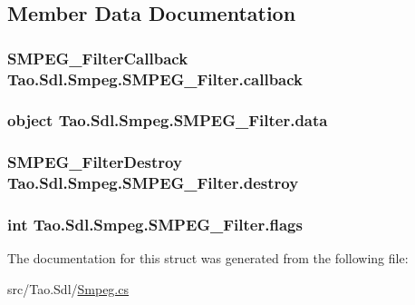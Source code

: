 \subsection{Member Data Documentation}
\hypertarget{struct_tao_1_1_sdl_1_1_smpeg_1_1_s_m_p_e_g___filter_a5b5d470674ea23833cca1917d63dc220}{
\subsubsection[{callback}]{\setlength{\rightskip}{0pt plus 5cm}SMPEG\_\-FilterCallback {\bf Tao.Sdl.Smpeg.SMPEG\_\-Filter.callback}}}
\label{struct_tao_1_1_sdl_1_1_smpeg_1_1_s_m_p_e_g___filter_a5b5d470674ea23833cca1917d63dc220}
\hypertarget{struct_tao_1_1_sdl_1_1_smpeg_1_1_s_m_p_e_g___filter_a82ef4198a1b181e72f68cf47c4699f13}{
\subsubsection[{data}]{\setlength{\rightskip}{0pt plus 5cm}object {\bf Tao.Sdl.Smpeg.SMPEG\_\-Filter.data}}}
\label{struct_tao_1_1_sdl_1_1_smpeg_1_1_s_m_p_e_g___filter_a82ef4198a1b181e72f68cf47c4699f13}
\hypertarget{struct_tao_1_1_sdl_1_1_smpeg_1_1_s_m_p_e_g___filter_a13cbd131078d63547eb940ac7eb6f794}{
\subsubsection[{destroy}]{\setlength{\rightskip}{0pt plus 5cm}SMPEG\_\-FilterDestroy {\bf Tao.Sdl.Smpeg.SMPEG\_\-Filter.destroy}}}
\label{struct_tao_1_1_sdl_1_1_smpeg_1_1_s_m_p_e_g___filter_a13cbd131078d63547eb940ac7eb6f794}
\hypertarget{struct_tao_1_1_sdl_1_1_smpeg_1_1_s_m_p_e_g___filter_a3c583eca1c4a47e8908a565382bfde9e}{
\subsubsection[{flags}]{\setlength{\rightskip}{0pt plus 5cm}int {\bf Tao.Sdl.Smpeg.SMPEG\_\-Filter.flags}}}
\label{struct_tao_1_1_sdl_1_1_smpeg_1_1_s_m_p_e_g___filter_a3c583eca1c4a47e8908a565382bfde9e}


The documentation for this struct was generated from the following file:\begin{DoxyCompactItemize}
\item 
src/Tao.Sdl/\hyperlink{_smpeg_8cs}{Smpeg.cs}\end{DoxyCompactItemize}
